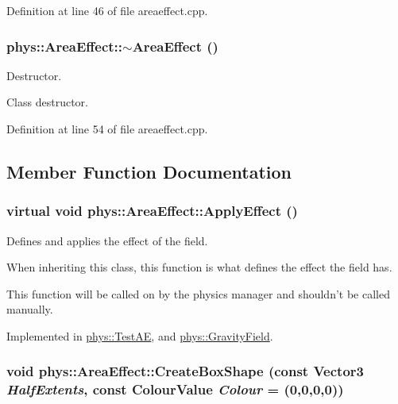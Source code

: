 Definition at line 46 of file areaeffect.cpp.

\hypertarget{classphys_1_1AreaEffect_aa9e6d721d337c32aa47357060d319924}{
\subsubsection[{$\sim$AreaEffect}]{\setlength{\rightskip}{0pt plus 5cm}phys::AreaEffect::$\sim$AreaEffect ()}}
\label{d4/d55/classphys_1_1AreaEffect_aa9e6d721d337c32aa47357060d319924}


Destructor. 

Class destructor. 

Definition at line 54 of file areaeffect.cpp.



\subsection{Member Function Documentation}
\hypertarget{classphys_1_1AreaEffect_a3b285ecfcf9c9200662d510e48dd222a}{
\subsubsection[{ApplyEffect}]{\setlength{\rightskip}{0pt plus 5cm}virtual void phys::AreaEffect::ApplyEffect ()}}
\label{d4/d55/classphys_1_1AreaEffect_a3b285ecfcf9c9200662d510e48dd222a}


Defines and applies the effect of the field. 

When inheriting this class, this function is what defines the effect the field has. \par
 This function will be called on by the physics manager and shouldn't be called manually. 

Implemented in \hyperlink{classphys_1_1TestAE_a191c60dbfa277e850ea392d9ab774c42}{phys::TestAE}, and \hyperlink{classphys_1_1GravityField_a0322cb1635bbcb951493d9e17cc9acb1}{phys::GravityField}.

\hypertarget{classphys_1_1AreaEffect_a00ea72b91a4b70bc1e85f262332afb9a}{
\subsubsection[{CreateBoxShape}]{\setlength{\rightskip}{0pt plus 5cm}void phys::AreaEffect::CreateBoxShape (const {\bf Vector3} {\em HalfExtents}, \/  const {\bf ColourValue} {\em Colour} = {(0,0,0,0)})}}
\label{d4/d55/classphys_1_1AreaEffect_a00ea72b91a4b70bc1e85f262332afb9a}


